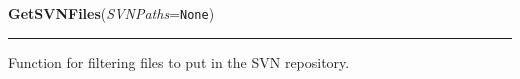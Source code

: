     \vspace{0.5ex}

\hspace{.8\funcindent}\begin{boxedminipage}{\funcwidth}

    \raggedright \textbf{GetSVNFiles}(\textit{SVNPaths}={\tt None})

    \vspace{-1.5ex}

    \rule{\textwidth}{0.5\fboxrule}
\setlength{\parskip}{2ex}
    Function for filtering files to put in the SVN repository.

\setlength{\parskip}{1ex}
    \end{boxedminipage}

